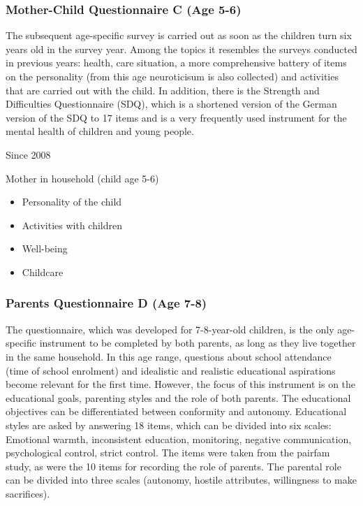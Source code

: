 \documentclass[letterpaper,10pt,openany,onesideH,english]{sphinxmanual}
\begin{document}
\subsubsection{Mother-Child Questionnaire C (Age 5-6)}
\label{\detokenize{Contents of SOEPcore/index:mother-child-questionnaire-c-age-5-6}}\label{\detokenize{Contents of SOEPcore/index:mother-child-questionnaire-c}}
The subsequent age-specific survey is carried out as soon as the children turn six years old in the survey year. Among the topics it resembles the surveys conducted in previous years: health, care situation, a more comprehensive battery of items on the personality (from this age neuroticisum is also collected) and activities that are carried out with the child. In addition, there is the Strength and Difficulties Questionnaire (SDQ), which is a shortened version of the German version of the SDQ to 17 items and is a very frequently used instrument for the mental health of children and young people.

 Since 2008

 Mother in household (child age 5-6)

\begin{itemize}
\item {} 
Personality of the child

\item {} 
Activities with children

\item {} 
Well-being

\item {} 
Childcare

\end{itemize}


\subsubsection{Parents Questionnaire D (Age 7-8)}
\label{\detokenize{Contents of SOEPcore/index:parents-questionnaire-d-age-7-8}}\label{\detokenize{Contents of SOEPcore/index:parents-d}}
The questionnaire, which was developed for 7-8-year-old children, is the only age-specific instrument to be completed by both parents, as long as they live together in the same household. In this age range, questions about school attendance (time of school enrolment) and idealistic and realistic educational aspirations become relevant for the first time. However, the focus of this instrument is on the educational goals, parenting styles and the role of both parents. The educational objectives can be differentiated between conformity and autonomy. Educational styles are asked by answering 18 items, which can be divided into six scales: Emotional warmth, inconsistent education, monitoring, negative communication, psychological control, strict control. The items were taken from the pairfam study, as were the 10 items for recording the role of parents. The parental role can be divided into three scales (autonomy, hostile attributes, willingness to make sacrifices).
\end{document}

